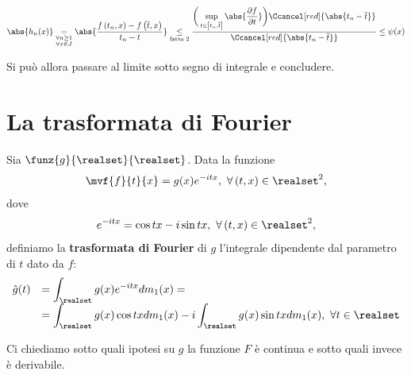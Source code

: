 \begin{demonstrationcaputwt}
\begin{enumerate}[label=\Roman*]
\begin{itemize}
			\begin{equation*}
				\abs{h_n(x)}\underset{\substack{\forall n\geq 1\\\forall x\in J}}{=}\abs{\frac{f\left(t_n,x\right)-f\left(\overline{t},x\right)}{t_n-t}}\underset{\text{fatto }2}{\leq}  \frac{\displaystyle \bigg(\sup_{t\in\left[t_n,\overline{t}\right]}\abs{\frac{\partial f}{\partial t}} \bigg) \Ccancel[red]{\abs{t_n-\overline{t}}}}{\Ccancel[red]{\abs{t_n-\overline{t}}}}\leq \psi(x)
			\end{equation*}
		\end{itemize}
		Si può allora passare al limite sotto segno di integrale e concludere.\qedhere
	\end{enumerate}
\end{demonstrationcaputwt}
\section{La trasformata di Fourier}
\begin{define}
	Sia $\funz{g}{\realset}{\realset}$. Data la funzione
	\begin{equation*}
		\mvf{f}{t}{x}=g(x)e^{-itx},\ \forall \left(t,x\right)\in\realset^2,
	\end{equation*}
	dove
	\begin{equation*}
		e^{-itx}=\cos tx-i\sin tx,\ \forall\left(t,x\right)\in\realset^2,
	\end{equation*}
	definiamo la \textbf{trasformata di Fourier} di $g$ l'integrale dipendente dal parametro di $t$ dato da $f$:
	\begin{equation}
		\begin{array}{rl}
			\displaystyle\hat{g}(t)&=\displaystyle\int_{\realset}g(x)e^{-itx}dm_1(x)=\\
			&=\displaystyle\int_{\realset}g(x)\cos txdm_1(x)-i\int_\realset g(x)\sin txdm_1(x),\ \forall t\in\realset
		\end{array}
	\end{equation}
\end{define}
Ci chiediamo sotto quali ipotesi su $g$ la funzione $F$ è continua e sotto quali invece è derivabile.
